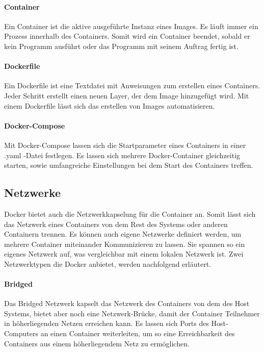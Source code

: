 		\paragraph{Container}
			Ein Container ist die aktive ausgeführte Instanz eines Images.
			Es läuft immer ein Prozess innerhalb des Containers.
			Somit wird ein Container beendet, sobald er kein Programm ausführt oder das Programm mit seinem Auftrag fertig ist.
			
		\paragraph{Dockerfile}
			Ein Dockerfile ist eine Textdatei mit Anweisungen zum erstellen eines Containers.
			Jeder Schritt erstellt einen neuen Layer, der dem Image hinzugefügt wird.
			Mit einem Dockerfile lässt sich das erstellen von Images automatisieren.
		
		\paragraph{Docker-Compose}
			Mit Docker-Compose lassen sich die Startparameter eines Containers in einer .yaml -Datei festlegen.
			Es lassen sich mehrere Docker-Container gleichzeitig starten, sowie umfangreiche Einstellungen bei dem Start des Containers treffen.
		
		\subsection{Netzwerke}
		\label{Grundlagen:Docker:Netzwerke}
			Docker bietet auch die Netzwerkkapselung für die Container an.
			Somit lässt sich das Netzwerk eines Containers von dem Rest des Systems oder anderen Containern trennen.
			Es können auch eigene Netzwerke definiert werden, um mehrere Container miteinander Kommunizieren zu lassen.
			Sie spannen so ein eigenes Netzwerk auf, was vergleichbar mit einem lokalen Netzwerk ist.
			Zwei Netzwerktypen die Docker anbietet, werden nachfolgend erläutert.
			\paragraph{Bridged}
				Das Bridged Netzwerk kapselt das Netzwerk des Containers von dem des Host Systems, bietet aber noch eine Netzwerk-Brücke, damit der Container Teilnehmer in höherliegenden Netzen erreichen kann.
				Es lassen sich Ports des Host-Computers an einen Container weiterleiten, um so eine Erreichbarkeit des Containers aus einem höherliegendem Netz zu ermöglichen.
				
